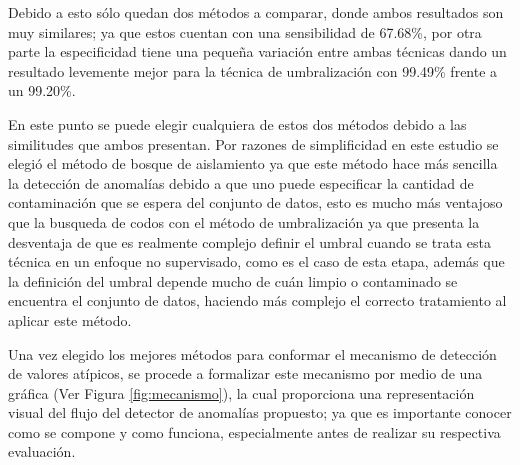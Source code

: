 \vspace{5mm} %

Debido a esto s\'{o}lo quedan dos m\'{e}todos a comparar, donde ambos resultados son muy similares; ya que estos cuentan con una sensibilidad de 67.68\%, por otra parte la especificidad tiene una peque\~{n}a variaci\'{o}n entre ambas t\'{e}cnicas dando un resultado levemente mejor para la t\'{e}cnica de umbralizaci\'{o}n con 99.49\% frente a un 99.20\%.

\vspace{5mm} %

En este punto se puede elegir cualquiera de estos dos m\'{e}todos debido a las similitudes que ambos presentan. Por razones de simplificidad en este estudio se elegi\'{o} el m\'{e}todo de bosque de aislamiento ya que este m\'{e}todo hace m\'{a}s sencilla la detecci\'{o}n de anomal\'{i}as debido a que uno puede especificar la cantidad de contaminaci\'{o}n que se espera del conjunto de datos, esto es mucho m\'{a}s ventajoso que la busqueda de codos con el m\'{e}todo de umbralizaci\'{o}n ya que presenta la desventaja de que es realmente complejo definir el umbral cuando se trata esta t\'{e}cnica en un enfoque no supervisado, como es el caso de esta etapa, adem\'{a}s que la definici\'{o}n del umbral depende mucho de cu\'{a}n limpio o contaminado se encuentra el conjunto de datos, haciendo m\'{a}s complejo el correcto tratamiento al aplicar este m\'{e}todo.

\vspace{5mm} %

Una vez elegido los mejores m\'{e}todos para conformar el mecanismo de detecci\'{o}n de valores at\'{i}picos, se procede a formalizar este mecanismo por medio de una gr\'{a}fica (Ver Figura \ref{fig:mecanismo}), la cual proporciona una representaci\'{o}n visual del flujo del detector de anomal\'{i}as propuesto; ya que es importante conocer como se compone y como funciona, especialmente antes de realizar su respectiva evaluaci\'{o}n. 


